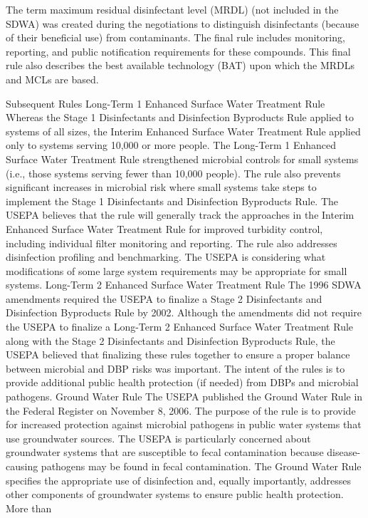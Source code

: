\documentclass{article}
\begin{document}
The term maximum residual disinfectant level (MRDL) (not included in the
SDWA) was created during the negotiations to distinguish disinfectants
(because of their beneficial use) from contaminants. The final rule
includes monitoring, reporting, and public notification requirements for
these compounds. This final rule also describes the best available
technology (BAT) upon which the MRDLs and MCLs are based.

Subsequent Rules Long-Term 1 Enhanced Surface Water Treatment Rule
Whereas the Stage 1 Disinfectants and Disinfection Byproducts Rule
applied to systems of all sizes, the Interim Enhanced Surface Water
Treatment Rule applied only to systems serving 10,000 or more people.
The Long-Term 1 Enhanced Surface Water Treatment Rule strengthened
microbial controls for small systems (i.e., those systems serving fewer
than 10,000 people). The rule also prevents significant increases in
microbial risk where small systems take steps to implement the Stage 1
Disinfectants and Disinfection Byproducts Rule. The USEPA believes that
the rule will generally track the approaches in the Interim Enhanced
Surface Water Treatment Rule for improved turbidity control, including
individual filter monitoring and reporting. The rule also addresses
disinfection profiling and benchmarking. The USEPA is considering what
modifications of some large system requirements may be appropriate for
small systems. Long-Term 2 Enhanced Surface Water Treatment Rule The
1996 SDWA amendments required the USEPA to finalize a Stage 2
Disinfectants and Disinfection Byproducts Rule by 2002. Although the
amendments did not require the USEPA to finalize a Long-Term 2 Enhanced
Surface Water Treatment Rule along with the Stage 2 Disinfectants and
Disinfection Byproducts Rule, the USEPA believed that finalizing these
rules together to ensure a proper balance between microbial and DBP
risks was important. The intent of the rules is to provide additional
public health protection (if needed) from DBPs and microbial pathogens.
Ground Water Rule The USEPA published the Ground Water Rule in the
Federal Register on November 8, 2006. The purpose of the rule is to
provide for increased protection against microbial pathogens in public
water systems that use groundwater sources. The USEPA is particularly
concerned about groundwater systems that are susceptible to fecal
contamination because disease-causing pathogens may be found in fecal
contamination. The Ground Water Rule specifies the appropriate use of
disinfection and, equally importantly, addresses other components of
groundwater systems to ensure public health protection. More than
\end{document}
